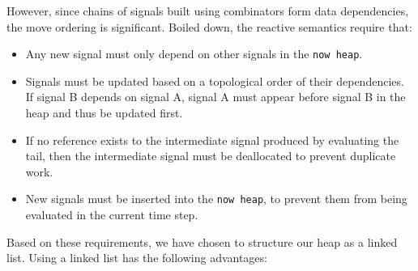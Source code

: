 However, since chains of signals built using combinators form data dependencies, the move ordering is significant. 
Boiled down, the reactive semantics require that:
\begin{itemize}
    \item Any new signal must only depend on other signals in the \texttt{now heap}.
    \item Signals must be updated based on a topological order of their dependencies. If signal B depends on signal A, signal A must appear before signal B in the heap and thus be updated first.
    \item If no reference exists to the intermediate signal produced by evaluating the tail, then the intermediate signal must be deallocated to prevent duplicate work.
    \item New signals must be inserted into the \texttt{now heap}, to prevent them from being evaluated in the current time step.
\end{itemize}


Based on these requirements, we have chosen to structure our heap as a linked list. Using a linked list has the following advantages:

